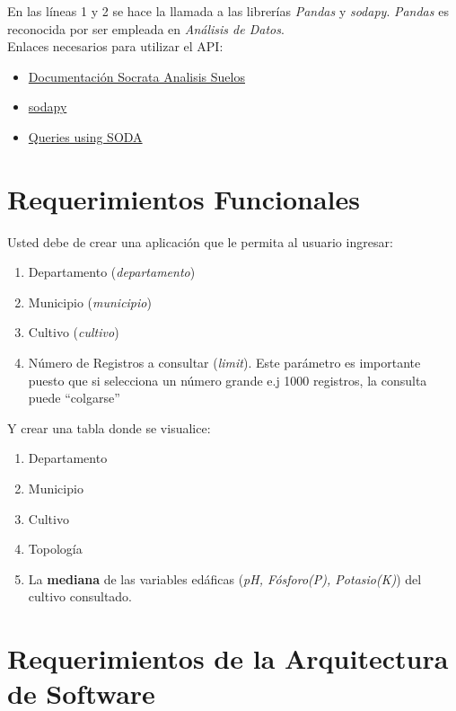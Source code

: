 \documentclass[12pt]{article}
\begin{document}
En las líneas 1 y 2 se hace la llamada a las librerías \textit{Pandas} y \textit{sodapy}. \textit{Pandas} es reconocida por ser empleada en \textit{Análisis de Datos}.\\

Enlaces necesarios para utilizar el API:

\begin{itemize}
    \item \href{https://dev.socrata.com/foundry/www.datos.gov.co/ch4u-f3i5}{Documentación Socrata Analisis Suelos} 
    \item \href{https://github.com/xmunoz/sodapy}{sodapy} \item \href{https://dev.socrata.com/docs/queries/}{Queries using SODA}
\end{itemize}



\section{Requerimientos Funcionales}
\label{requerimientos_funcionales}

Usted debe de crear una aplicación que le permita al usuario ingresar: 

\begin{enumerate}
    \item Departamento (\textit{departamento})
    \item Municipio (\textit{municipio})
    \item Cultivo (\textit{cultivo})
    \item Número de Registros a consultar (\textit{limit}). Este parámetro es importante puesto que si selecciona un número grande e.j 1000 registros, la consulta puede ``colgarse''
\end{enumerate}

Y crear una tabla donde se visualice: 

\begin{enumerate}
    \item Departamento
    \item Municipio 
    \item Cultivo
    \item Topología
    \item La \textbf{mediana} de las variables edáficas (\textit{pH, Fósforo(P), Potasio(K)}) del cultivo consultado.
\end{enumerate}




\section{Requerimientos de la Arquitectura de Software}
\end{document}
